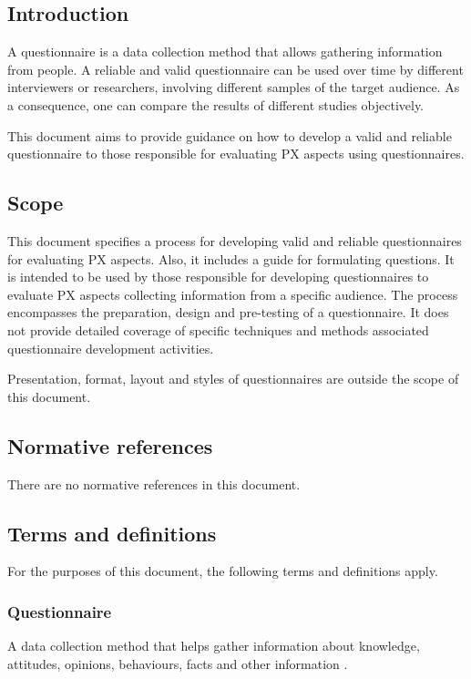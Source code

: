 \label{sec:sta_proposal}

\subsection{Introduction}
A questionnaire is a data collection method that allows gathering information from people. A reliable and valid questionnaire can be used over time by different interviewers or researchers, involving different samples of the target audience. As a consequence, one can compare the results of different studies objectively.

This document aims to provide guidance on how to develop a valid and reliable questionnaire to those responsible for evaluating \ac{PX} aspects using questionnaires.

\subsection{Scope}

This document specifies a process for developing valid and reliable questionnaires for evaluating \ac{PX} aspects. Also, it includes a guide for formulating questions. It is intended to be used by those responsible for developing questionnaires to evaluate \ac{PX} aspects collecting information from a specific audience. The process encompasses the preparation, design and pre-testing of a questionnaire. It does not provide detailed coverage of specific techniques and methods associated questionnaire development activities.

Presentation, format, layout and styles of questionnaires are outside the scope of this document.

\subsection{Normative references}
There are no normative references in this document.

\subsection{Terms and definitions}
For the purposes of this document, the following terms and definitions apply.

\subsubsection{Questionnaire}
A data collection method that helps gather information about knowledge, attitudes, opinions, behaviours, facts and other information \autocite{Radhakrishna2007}.

